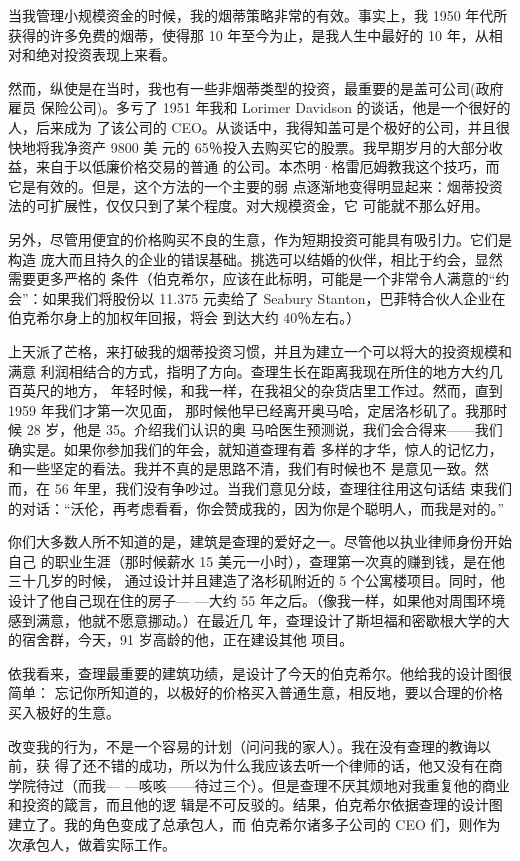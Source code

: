 \documentclass[UTF8,a4paper,zihao=-4,fontset = windows]{ctexart} %
\begin{document}
当我管理小规模资金的时候，我的烟蒂策略非常的有效。事实上，我 1950 年代所获得的许多免费的烟蒂，使得那 10 年至今为止，是我人生中最好的 10 年，从相对和绝对投资表现上来看。

然而，纵使是在当时，我也有一些非烟蒂类型的投资，最重要的是盖可公司(政府雇员
保险公司)。多亏了 1951 年我和 Lorimer Davidson 的谈话，他是一个很好的人，后来成为
了该公司的 CEO。从谈话中，我得知盖可是个极好的公司，并且很快地将我净资产 9800 美
元的 65％投入去购买它的股票。我早期岁月的大部分收益，来自于以低廉价格交易的普通
的公司。本杰明·格雷厄姆教我这个技巧，而它是有效的。但是，这个方法的一个主要的弱
点逐渐地变得明显起来：烟蒂投资法的可扩展性，仅仅只到了某个程度。对大规模资金，它
可能就不那么好用。

另外，尽管用便宜的价格购买不良的生意，作为短期投资可能具有吸引力。它们是构造
庞大而且持久的企业的错误基础。挑选可以结婚的伙伴，相比于约会，显然需要更多严格的
条件（伯克希尔，应该在此标明，可能是一个非常令人满意的“约会”：如果我们将股份以
11.375 元卖给了 Seabury Stanton，巴菲特合伙人企业在伯克希尔身上的加权年回报，将会
到达大约 40％左右。）

上天派了芒格，来打破我的烟蒂投资习惯，并且为建立一个可以将大的投资规模和满意
利润相结合的方式，指明了方向。查理生长在距离我现在所住的地方大约几百英尺的地方，
年轻时候，和我一样，在我祖父的杂货店里工作过。然而，直到 1959 年我们才第一次见面，
那时候他早已经离开奥马哈，定居洛杉矶了。我那时候 28 岁，他是 35。介绍我们认识的奥
马哈医生预测说，我们会合得来——我们确实是。如果你参加我们的年会，就知道查理有着
多样的才华，惊人的记忆力，和一些坚定的看法。我并不真的是思路不清，我们有时候也不
是意见一致。然而，在 56 年里，我们没有争吵过。当我们意见分歧，查理往往用这句话结
束我们的对话：“沃伦，再考虑看看，你会赞成我的，因为你是个聪明人，而我是对的。”

你们大多数人所不知道的是，建筑是查理的爱好之一。尽管他以执业律师身份开始自己
的职业生涯（那时候薪水 15 美元一小时），查理第一次真的赚到钱，是在他三十几岁的时候，
通过设计并且建造了洛杉矶附近的 5 个公寓楼项目。同时，他设计了他自己现在住的房子—
—大约 55 年之后。（像我一样，如果他对周围环境感到满意，他就不愿意挪动。）在最近几
年，查理设计了斯坦福和密歇根大学的大的宿舍群，今天，91 岁高龄的他，正在建设其他
项目。

依我看来，查理最重要的建筑功绩，是设计了今天的伯克希尔。他给我的设计图很简单：
忘记你所知道的，以极好的价格买入普通生意，相反地，要以合理的价格买入极好的生意。

改变我的行为，不是一个容易的计划（问问我的家人）。我在没有查理的教诲以前，获
得了还不错的成功，所以为什么我应该去听一个律师的话，他又没有在商学院待过（而我—
—咳咳——待过三个）。但是查理不厌其烦地对我重复他的商业和投资的箴言，而且他的逻
辑是不可反驳的。结果，伯克希尔依据查理的设计图建立了。我的角色变成了总承包人，而
伯克希尔诸多子公司的 CEO 们，则作为次承包人，做着实际工作。
\end{document}
